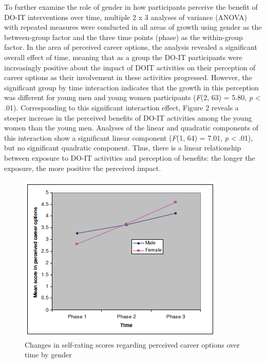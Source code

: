 \documentclass[11.5pt]{sig-alternate} %
\begin{document}
\begin{large}
To further examine the role of gender in how participants perceive the benefit of DO-IT interventions over time, multiple 2 x 3 analyses of variance (ANOVA) with repeated measures were conducted in all areas of growth using gender as the between-group factor and the three time points (phase) as the within-group factor. In the area of perceived career options, the analysis revealed a significant overall effect of time, meaning that as a group the DO-IT participants were increasingly positive about the impact of DOIT activities on their perception of career options as their involvement in these activities progressed. However, the significant group by time interaction indicates that the growth in this perception was different for young men and young women participants (\textit{F}(2, 63) = 5.80, \textit{p} < .01). Corresponding to this significant interaction effect, Figure 2 reveals a steeper increase in the perceived benefits of DO-IT activities among the young women than the young men. Analyses of the linear and quadratic components of this interaction show a significant linear component (\textit{F}(1, 64) = 7.01, \textit{p} < .01), but no significant quadratic component. Thus, there is a linear relationship between exposure to DO-IT activities and perception of benefits: the longer the exposure, the more positive the perceived impact. 

\begin{figure}[h]
    \centering
    \includegraphics[width=1\linewidth]{fig2.png}
    \caption{Changes in self-rating scores regarding perceived career options over time by gender }
\end{figure}


\end{large}
\end{document}
